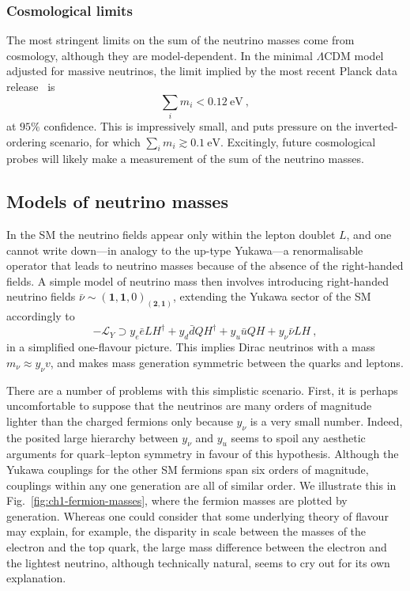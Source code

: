 \subsubsection{Cosmological limits}

The most stringent limits on the sum of the neutrino masses come from cosmology,
although they are model-dependent. In the minimal $\Lambda$CDM model adjusted
for massive neutrinos, the limit implied by the most recent Planck data
release~\cite{Aghanim:2018eyx} is
\begin{equation}
  \sum_{i} m_{i} < \SI{0.12}{\eV} \ ,
\end{equation}
at $95\%$ confidence. This is impressively small, and puts pressure on the
inverted-ordering scenario, for which $\sum_{i} m_{i} \gtrsim \SI{0.1}{\eV}$.
Excitingly, future cosmological probes will likely make a measurement of the sum
of the neutrino masses.

\subsection{Models of neutrino masses}
\label{sec:ch1-models-of-mv}

In the SM the neutrino fields appear only within the lepton doublet $L$, and one
cannot write down---in analogy to the up-type Yukawa---a renormalisable operator
that leads to neutrino masses because of the absence of the right-handed fields.
A simple model of neutrino mass then involves introducing right-handed neutrino
fields $\bar{\nu} \sim (\mathbf{1}, \mathbf{1}, 0)_{(\mathbf{2}, \mathbf{1})}$,
extending the Yukawa sector of the SM accordingly to
\begin{equation}
  -\mathscr{L}_{Y} \supset y_{e}\bar{e}LH^{\dagger} + y_{d}\bar{d}QH^{\dagger} + y_{u} \bar{u}QH + y_{\nu}\bar{\nu}LH \ ,
\end{equation}
in a simplified one-flavour picture. This implies Dirac neutrinos with a mass
$m_{\nu} \approx y_{\nu} v$, and makes mass generation symmetric between the
quarks and leptons.

There are a number of problems with this simplistic scenario. First, it is
perhaps uncomfortable to suppose that the neutrinos are many orders of magnitude
lighter than the charged fermions only because $y_{\nu}$ is a very small number.
Indeed, the posited large hierarchy between $y_{\nu}$ and $y_{u}$ seems to spoil
any aesthetic arguments for quark--lepton symmetry in favour of this hypothesis.
Although the Yukawa couplings for the other SM fermions span six orders of
magnitude, couplings within any one generation are all of similar order. We
illustrate this in Fig.~\ref{fig:ch1-fermion-masses}, where the fermion masses are
plotted by generation. Whereas one could consider that some underlying theory of
flavour may explain, for example, the disparity in scale between the masses of
the electron and the top quark, the large mass difference between the electron
and the lightest neutrino, although technically natural, seems to cry out for
its own explanation.

